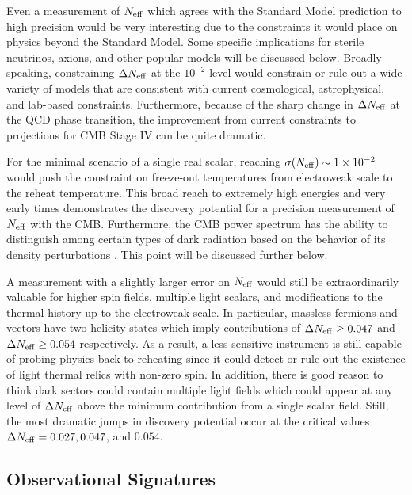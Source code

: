 Even a measurement of $N_{\rm eff}$ which agrees with the Standard Model prediction to high precision would be very interesting due to the constraints it would place on physics beyond the Standard Model.  Some specific implications for sterile neutrinos, axions, and other popular models will be discussed below.  Broadly speaking, constraining $\Delta N_{\rm eff}$ at the $10^{-2}$ level would constrain or rule out a wide variety of models that are consistent with current cosmological, astrophysical, and lab-based constraints.  Furthermore, because of the sharp change in $\Delta N_{\rm eff}$ at the QCD phase transition, the improvement from current constraints to projections for CMB Stage IV can be quite dramatic.

For the minimal scenario of a single real scalar, reaching $\sigma(N_{\rm eff}) \sim 1\times 10^{-2}$ would push the constraint on freeze-out temperatures from electroweak scale to the reheat temperature.  This broad reach to extremely high energies and very early times demonstrates the discovery potential for a precision measurement of $N_{\rm eff}$ with the CMB.  Furthermore, the CMB power spectrum has the ability to distinguish among certain types of dark radiation based on the behavior of its density perturbations  \cite{Chacko:2015noa,Baumann:2015rya}.  This point will be discussed further below.

A measurement with a slightly larger error on $N_{\rm eff}$ would still be extraordinarily valuable for higher spin fields, multiple light scalars, and modifications to the thermal history up to the electroweak scale.  In particular, massless fermions and vectors have two helicity states which imply contributions of $\Delta N_{\rm eff}  \geq 0.047$ and $\Delta N_{\rm eff}  \geq 0.054$ respectively.  As a result, a less sensitive instrument is still capable of probing physics back to reheating since it could detect or rule out the existence of light thermal relics with non-zero spin.  In addition, there is good reason to think dark sectors could contain multiple light fields which could appear at any level of $\Delta N_{\rm eff}$ above the minimum contribution from a single scalar field.  Still, the most dramatic jumps in discovery potential occur at the critical values $\Delta N_{\rm eff} = 0.027, 0.047$, and $0.054$.  



\subsection{Observational Signatures}

